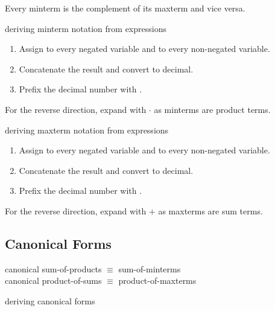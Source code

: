 Every minterm is the complement of its maxterm and vice versa.

\begin{defn*}{deriving minterm notation from expressions}
    \begin{enumerate}
        \item Assign  to every negated variable and  to every non-negated variable.
        \item Concatenate the result and convert to decimal.
        \item Prefix the decimal number with .
    \end{enumerate}
    
    For the reverse direction, expand with $\cdot$ as minterms are product terms.
\end{defn*}

\begin{defn*}{deriving maxterm notation from expressions}
    \begin{enumerate}
        \item Assign  to every negated variable and  to every non-negated variable.
        \item Concatenate the result and convert to decimal.
        \item Prefix the decimal number with .
    \end{enumerate}

    For the reverse direction, expand with $+$ as maxterms are sum terms.
\end{defn*}


\subsection{Canonical Forms}
\begin{boxed}[l]
    canonical sum-of-products $\equiv$ sum-of-minterms \\
    canonical product-of-sums $\equiv$ product-of-maxterms
\end{boxed}

\begin{defn*}{deriving canonical forms}
    \begin{itemize*}
    \end{itemize*}
\end{defn*}
